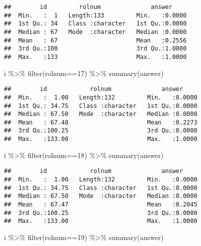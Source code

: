 \documentclass[
]{article}
\newenvironment{Shaded}{\begin{snugshade}}{\end{snugshade}}
\newcommand{\DecValTok}[1]{\textcolor[rgb]{0.00,0.00,0.81}{#1}}
\newcommand{\FunctionTok}[1]{\textcolor[rgb]{0.00,0.00,0.00}{#1}}
\newcommand{\NormalTok}[1]{#1}
\newcommand{\SpecialCharTok}[1]{\textcolor[rgb]{0.00,0.00,0.00}{#1}}
\begin{document}
\begin{enumerate}
\begin{verbatim}
##        id         rolnum              answer      
##  Min.   :  1   Length:133         Min.   :0.0000  
##  1st Qu.: 34   Class :character   1st Qu.:0.0000  
##  Median : 67   Mode  :character   Median :0.0000  
##  Mean   : 67                      Mean   :0.2556  
##  3rd Qu.:100                      3rd Qu.:1.0000  
##  Max.   :133                      Max.   :1.0000
\end{verbatim}

\begin{Shaded}
\begin{Highlighting}[]
\NormalTok{i }\SpecialCharTok{\%\textgreater{}\%} \FunctionTok{filter}\NormalTok{(rolnum}\SpecialCharTok{==}\DecValTok{17}\NormalTok{) }\SpecialCharTok{\%\textgreater{}\%} \FunctionTok{summary}\NormalTok{(answer)}
\end{Highlighting}
\end{Shaded}

\begin{verbatim}
##        id            rolnum              answer      
##  Min.   :  1.00   Length:132         Min.   :0.0000  
##  1st Qu.: 34.75   Class :character   1st Qu.:0.0000  
##  Median : 67.50   Mode  :character   Median :0.0000  
##  Mean   : 67.48                      Mean   :0.2273  
##  3rd Qu.:100.25                      3rd Qu.:0.0000  
##  Max.   :133.00                      Max.   :1.0000
\end{verbatim}

\begin{Shaded}
\begin{Highlighting}[]
\NormalTok{i }\SpecialCharTok{\%\textgreater{}\%} \FunctionTok{filter}\NormalTok{(rolnum}\SpecialCharTok{==}\DecValTok{18}\NormalTok{) }\SpecialCharTok{\%\textgreater{}\%} \FunctionTok{summary}\NormalTok{(answer)}
\end{Highlighting}
\end{Shaded}

\begin{verbatim}
##        id            rolnum              answer      
##  Min.   :  1.00   Length:132         Min.   :0.0000  
##  1st Qu.: 34.75   Class :character   1st Qu.:0.0000  
##  Median : 67.50   Mode  :character   Median :0.0000  
##  Mean   : 67.47                      Mean   :0.2045  
##  3rd Qu.:100.25                      3rd Qu.:0.0000  
##  Max.   :133.00                      Max.   :1.0000
\end{verbatim}

\begin{Shaded}
\begin{Highlighting}[]
\NormalTok{i }\SpecialCharTok{\%\textgreater{}\%} \FunctionTok{filter}\NormalTok{(rolnum}\SpecialCharTok{==}\DecValTok{19}\NormalTok{) }\SpecialCharTok{\%\textgreater{}\%} \FunctionTok{summary}\NormalTok{(answer)}
\end{Highlighting}
\end{Shaded}


\end{enumerate}
\end{document}
